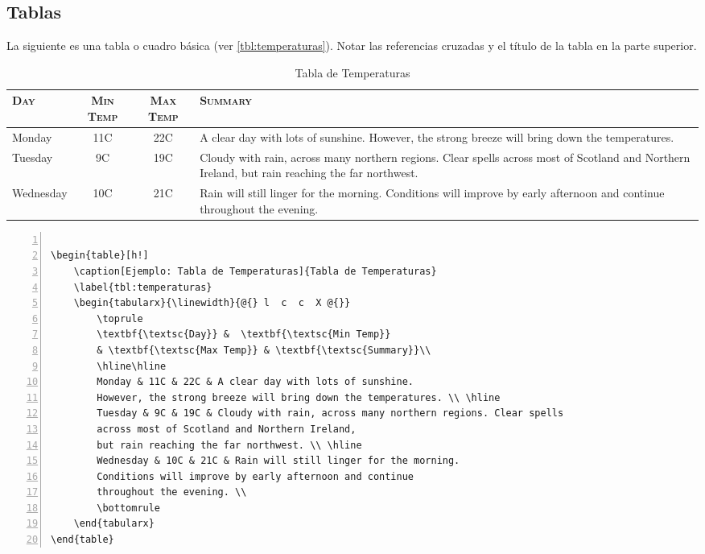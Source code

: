\subsection{Tablas}

La siguiente es una tabla o cuadro básica (ver \autoref{tbl:temperaturas}). Notar las referencias cruzadas y el título de la tabla en la parte superior.

\begin{table}[h!]
    \caption[Ejemplo: Tabla de Temperaturas]{Tabla de Temperaturas}
    \label{tbl:temperaturas}
    \begin{tabularx}{\linewidth}{@{} l  c  c  X @{}}
        \toprule
        \textbf{\textsc{Day}} &  \textbf{\textsc{Min Temp}} 
        		& \textbf{\textsc{Max Temp}} & \textbf{\textsc{Summary}}\\
    	  \hline\hline
        Monday & 11C & 22C & A clear day with lots of sunshine.
        However, the strong breeze will bring down the temperatures. \\ \hline
        Tuesday & 9C & 19C & Cloudy with rain, across many northern regions. Clear spells
        across most of Scotland and Northern Ireland,
        but rain reaching the far northwest. \\ \hline
        Wednesday & 10C & 21C & Rain will still linger for the morning.
        Conditions will improve by early afternoon and continue
        throughout the evening. \\
        \bottomrule
    \end{tabularx}
\end{table}

\begin{Verbatim}[frame=lines, label=\autoref{fig:logousm_float} Alternative
				, fontsize=\footnotesize, numbers=left
				, baselinestretch=1
				, formatcom=\color{gray}]

\begin{table}[h!]
    \caption[Ejemplo: Tabla de Temperaturas]{Tabla de Temperaturas}
    \label{tbl:temperaturas}
    \begin{tabularx}{\linewidth}{@{} l  c  c  X @{}}
        \toprule
        \textbf{\textsc{Day}} &  \textbf{\textsc{Min Temp}} 
        & \textbf{\textsc{Max Temp}} & \textbf{\textsc{Summary}}\\
        \hline\hline
        Monday & 11C & 22C & A clear day with lots of sunshine.
        However, the strong breeze will bring down the temperatures. \\ \hline
        Tuesday & 9C & 19C & Cloudy with rain, across many northern regions. Clear spells
        across most of Scotland and Northern Ireland,
        but rain reaching the far northwest. \\ \hline
        Wednesday & 10C & 21C & Rain will still linger for the morning.
        Conditions will improve by early afternoon and continue
        throughout the evening. \\
        \bottomrule
    \end{tabularx}
\end{table}
\end{Verbatim}



